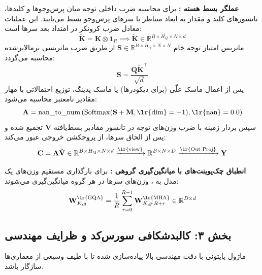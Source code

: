 \textbf{عملگر بسط هسته :}
برای محاسبه ضرب داخلی توجه میان پرس‌وجوها و کلیدها، تانسورهای کلید و مقدار به ابعاد متناظر با سرهای پرس‌وجو بسط می‌یابند. این عملیات معادل ضرب کرونکر  در امتداد بعد سرها است:
\begin{equation}
\tilde{\mathbf{K}} = \mathbf{K} \otimes \mathbf{1}_R \implies \tilde{\mathbf{K}} \in \mathbb{R}^{B \times H_Q \times N \times d}
\end{equation}
ماتریس امتیاز توجه خام $\mathbf{S} \in \mathbb{R}^{B \times H_Q \times N \times N}$ از طریق ضرب ماتریسی نرمالایز‌شده محاسبه می‌گردد:
\begin{equation}
\mathbf{S} = \frac{\mathbf{Q} \tilde{\mathbf{K}}^\top}{\sqrt{d}}
\end{equation}
پس از اعمال ماسک علّی (برای دیکودرها) یا ماسک پدینگ، توزیع احتمالاتی با مهار مقادیر نامعتبر  محاسبه می‌شود:
\begin{equation}
\mathbf{A} = \operatorname{nan\_to\_num}\left( \operatorname{Softmax}(\mathbf{S} + \mathbf{M}, \text{\lr{dim}}=-1), \text{\lr{nan}}=0.0 \right)
\end{equation}
سپس بردار زمینه با ضرب وزن‌های توجه در تانسور مقادیر بسط‌یافته $\tilde{\mathbf{V}}$ تجمیع شده و پس از الحاق سرها، از پروجکشن خروجی عبور می‌کند:
\begin{equation}
\mathbf{C} = \mathbf{A} \tilde{\mathbf{V}} \in \mathbb{R}^{B \times H_Q \times N \times d} \xrightarrow{\text{\lr{view}}} \mathbb{R}^{B \times N \times D} \xrightarrow{\text{\lr{Out Proj}}} \mathbf{Y}
\end{equation}

\textbf{انطباق چک‌پوینت‌های  با میانگین‌گیری گروهی :}
برای بارگذاری مستقیم وزن‌های یک مدل  به ، وزن‌های سرها در هر گروه میانگین‌گیری می‌شوند:
\begin{equation}
\mathbf{W}_{K, g}^{\text{\lr{GQA}}} = \frac{1}{R} \sum_{r=0}^{R-1} \mathbf{W}_{K, g \cdot R + r}^{\text{\lr{MHA}}} \in \mathbb{R}^{D \times d}
\end{equation}

\subsection*{بخش ۳: کالبدشکافی سورس‌کد و ظرایف مهندسی }
ماژول پایتونی  با دقت مهندسی بالا پیاده‌سازی شده تا با طیف وسیعی از معماری‌ها سازگار باشد. 

